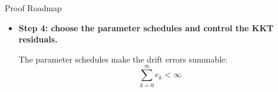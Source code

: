 \documentclass[handout,compress,9pt]{beamer}
\newcommand{\blue}[1]{\textcolor{ddlblue}{#1}}
\newcommand{\red}[1]{\textcolor{ddlred}{#1}}
\newcommand{\bx}{\bm{x}}
\newcommand{\by}{\bm{y}}
\begin{document}
\begin{frame}{Proof Roadmap}
\begin{itemize}
\item[\red{$\blacktriangleright$}]
\textbf{Step 4: choose the parameter schedules and control the KKT residuals.}

The parameter schedules make the drift errors summable:
\begin{equation*}
  \sum_{k=0}^{\infty} e_k < \infty
\end{equation*}
\vspace{-0.18cm}
\hfill
\hyperlink{appendix:lemmas}{%
}

\end{itemize}


\end{frame}



\end{document}
